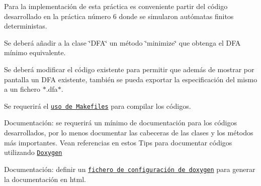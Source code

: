 \begin{DoxyItemize}
\item Para la implementación de esta práctica es conveniente partir del código desarrollado en la práctica número 6 donde se simularon autómatas finitos deterministas.
\item Se deberá añadir a la clase \char`\"{}\+D\+F\+A\char`\"{} un método \char`\"{}minimize\char`\"{} que obtenga el D\+FA mínimo equivalente.
\item Se deberá modificar el código existente para permitir que además de mostrar por pantalla un D\+FA existente, también se pueda exportar la especificación del mismo a un fichero $\ast$.dfa$\ast$.
\item Se requerirá el \href{http://stackoverflow.com/questions/2481269/how-to-make-simple-c-makefile}{\tt uso de Makefiles} para compilar los códigos.
\item Documentación\+: se requerirá un mínimo de documentación para los códigos desarrollados, por lo menos documentar las cabeceras de las clases y los métodos más importantes. Vean referencias en estos Tips para documentar códigos utilizando \href{http://www.stack.nl/~dimitri/doxygen/}{\tt Doxygen}
\item Documentación\+: definir un \href{http://codeyarns.com/2014/06/18/how-to-configure-doxygen-for-c-code/}{\tt fichero de configuración de doxygen} para generar la documentación en html. 
\end{DoxyItemize}